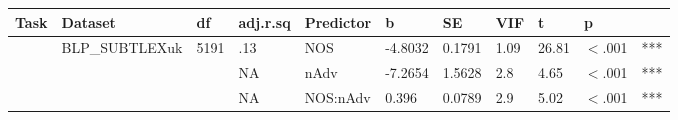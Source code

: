 \begin{table}[ht]
\centering
\begingroup\normalsize
\begin{tabular}{lllllllllll}
  \hline
Task & Dataset & df & adj.r.sq & Predictor & b & SE & VIF & t & p &  \\ 
  \hline
 & BLP\_SUBTLEXuk & 5191 & .13 & NOS & -4.8032 & 0.1791 & 1.09 & 26.81 & $<$.001 & *** \\ 
   &  &  & NA & nAdv & -7.2654 & 1.5628 & 2.8 & 4.65 & $<$.001 & *** \\ 
   &  &  & NA & NOS:nAdv & 0.396 & 0.0789 & 2.9 & 5.02 & $<$.001 & *** \\ 
   \hline
\end{tabular}
\endgroup
\end{table}

